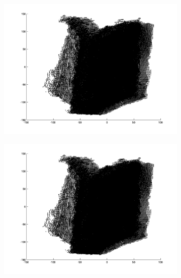 \begin{figure}
	\begin{subfigure}[b]{0.3\textwidth}
		\centering
		\includegraphics[width=\textwidth]{Images/Book10.png}
		\caption{}
	\end{subfigure}%
	\begin{subfigure}[b]{0.3\textwidth}
		\centering
		\includegraphics[width=\textwidth]{Images/Book11.png}
		\caption{}
	\end{subfigure}
	\begin{subfigure}[b]{0.3\textwidth}
		\centering

\end{subfigure}
\end{figure}
